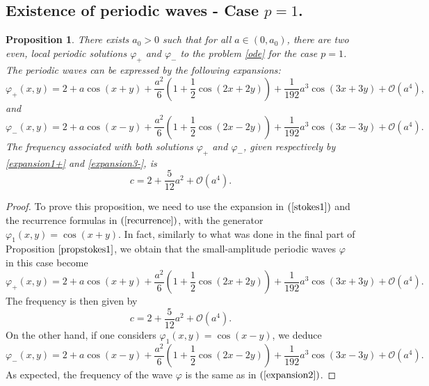 \documentclass[12pt,reqno,a4paper]{amsart} %
\numberwithin{equation}{section}
\numberwithin{figure}{section}
\newtheorem{proposition}[theorem]{Proposition}
\begin{document}
\subsection{Existence of periodic waves - Case $p=1$.}
	\begin{proposition}\label{propstokes12+}
There exists $a_0 > 0$ such that for all $a \in (0,a_0)$, there are two even, local periodic solutions $\varphi_+$ and $\varphi_{-}$ to the problem \eqref{ode} for the case $p=1$. The periodic waves can be expressed by the following expansions:
\begin{equation}\label{expansion1+}
	\varphi_{+}(x,y) = 2 + a\cos(x+y) + \frac{a^2}{6}\left(1 + \frac{1}{2}\cos(2x+2y)\right) + \frac{1}{192}a^3\cos(3x+3y) + \mathcal{O}(a^4),
\end{equation}
and
\begin{equation}\label{expansion3-}
	\varphi_{-}(x,y) = 2 + a\cos(x-y) + \frac{a^2}{6}\left(1 + \frac{1}{2}\cos(2x-2y)\right) + \frac{1}{192}a^3\cos(3x-3y) + \mathcal{O}(a^4).
\end{equation}
The frequency associated with both solutions $\varphi_+$ and $\varphi_{-}$, given respectively by \eqref{expansion1+} and \eqref{expansion3-}, is
\begin{equation}\label{expansion2+}
	c = 2 + \frac{5}{12}a^2 + \mathcal{O}(a^4).
\end{equation}
		
	\end{proposition}
\begin{proof} To prove this proposition, we need to use the expansion in $(\ref{stokes1})$ and the recurrence formulas in $(\ref{recurrence})$, with the generator $\varphi_1(x,y) = \cos(x + y)$. In fact, similarly to what was done in the final part of Proposition $\ref{propstokes1}$, we obtain that the small-amplitude periodic waves $\varphi$ in this case become
\begin{equation}\label{expansion1}
	\varphi_{+}(x,y)=2+a\cos(x+y)+\frac{a^2}{6}\left(1+\frac{1}{2}\cos(2x+2y)\right)+\frac{1}{192}a^3\cos(3x+3y)+\mathcal{O}(a^4).
	\end{equation}
The frequency is then given by
\begin{equation}\label{expansion2}
	c=2+\frac{5}{12}a^2+\mathcal{O}(a^4).
	\end{equation}
	\indent On the other hand, if one considers $\varphi_1(x,y)=\cos(x-y)$, we deduce
\begin{equation}\label{expansion3}
	\varphi_{-}(x,y)=2+a\cos(x-y)+\frac{a^2}{6}\left(1+\frac{1}{2}\cos(2x-2y)\right)+\frac{1}{192}a^3\cos(3x-3y)+\mathcal{O}(a^4).
\end{equation}	
As expected, the frequency of the wave $\varphi$ is the same as in $(\ref{expansion2})$.
\end{proof}
\end{document}
